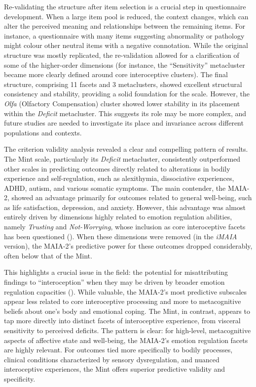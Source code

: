 \documentclass[
  jou,
  floatsintext,
  longtable,
  nolmodern,
  notxfonts,
  notimes,
  colorlinks=true,linkcolor=blue,citecolor=blue,urlcolor=blue]{apa7}
\begin{document}
Re-validating the structure after item selection is a crucial step in
questionnaire development. When a large item pool is reduced, the
context changes, which can alter the perceived meaning and relationships
between the remaining items. For instance, a questionnaire with many
items suggesting abnormality or pathology might colour other neutral
items with a negative connotation. While the original structure was
mostly replicated, the re-validation allowed for a clarification of some
of the higher-order dimensions (for instance, the ``Sensitivity''
metacluster became more clearly defined around core interoceptive
clusters). The final structure, comprising 11 facets and 3 metaclusters,
showed excellent structural consistency and stability, providing a solid
foundation for the scale. However, the \emph{Olfa} (Olfactory
Compensation) cluster showed lower stability in its placement within the
\emph{Deficit} metacluster. This suggests its role may be more complex,
and future studies are needed to investigate its place and invariance
across different populations and contexts.

The criterion validity analysis revealed a clear and compelling pattern
of results. The Mint scale, particularly its \emph{Deficit} metacluster,
consistently outperformed other scales in predicting outcomes directly
related to alterations in bodily experience and self-regulation, such as
alexithymia, dissociative experiences, ADHD, autism, and various somatic
symptoms. The main contender, the MAIA-2, showed an advantage primarily
for outcomes related to general well-being, such as life satisfaction,
depression, and anxiety. However, this advantage was almost entirely
driven by dimensions highly related to emotion regulation abilities,
namely \emph{Trusting} and \emph{Not-Worrying}, whose inclusion as core
interoceptive facets has been questioned
(). When
these dimensions were removed (in the \emph{iMAIA} version), the
MAIA-2's predictive power for these outcomes dropped considerably, often
below that of the Mint.

This highlights a crucial issue in the field: the potential for
misattributing findings to ``interoception'' when they may be driven by
broader emotion regulation capacities
(). While valuable,
the MAIA-2's most predictive subscales appear less related to core
interoceptive processing and more to metacognitive beliefs about one's
body and emotional coping. The Mint, in contrast, appears to tap more
directly into distinct facets of interoceptive experience, from visceral
sensitivity to perceived deficits. The pattern is clear: for high-level,
metacognitive aspects of affective state and well-being, the MAIA-2's
emotion regulation facets are highly relevant. For outcomes tied more
specifically to bodily processes, clinical conditions characterized by
sensory dysregulation, and nuanced interoceptive experiences, the Mint
offers superior predictive validity and specificity.
\end{document}
